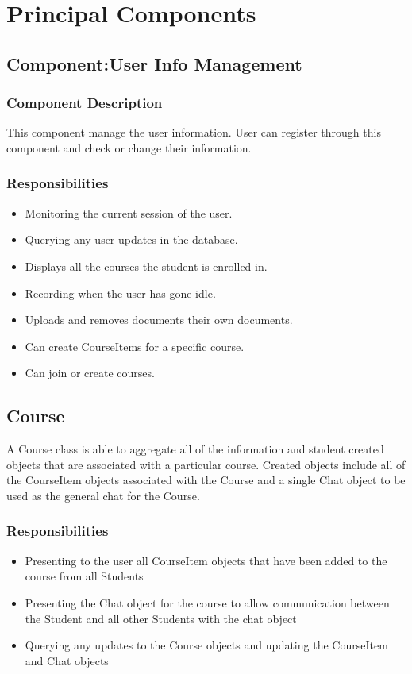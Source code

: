 \documentclass[16pt]{scrreprt}
\begin{document}

\chapter{Principal Components}
	
\section{Component:User Info Management}
\subsection{Component Description}
This component manage the user information. User can register through this component and check or change their information.
\subsection{Responsibilities}
\begin{itemize}
	\item Monitoring the current session of the user.
	\item Querying any user updates in the database. 
	\item Displays all the courses the student is enrolled in. 
	\item Recording when the user has gone idle. 
	\item Uploads and removes documents their own documents.
	\item Can create CourseItems for a specific course.
	\item Can join or create courses.
\end{itemize}

\section{Course}
A Course class is able to aggregate all of the information and student created objects that are associated with a particular course. Created objects include all of the CourseItem objects associated with the Course and a single Chat object to be used as the general chat for the Course.
\subsection{Responsibilities}
\begin{itemize}
	\item Presenting to the user all CourseItem objects that have been added to the course from all Students 
	\item Presenting the Chat object for the course to allow communication between the Student and all other Students with the chat object
	\item Querying any updates to the Course objects and updating the CourseItem and Chat objects
\end{itemize}
\end{document}
